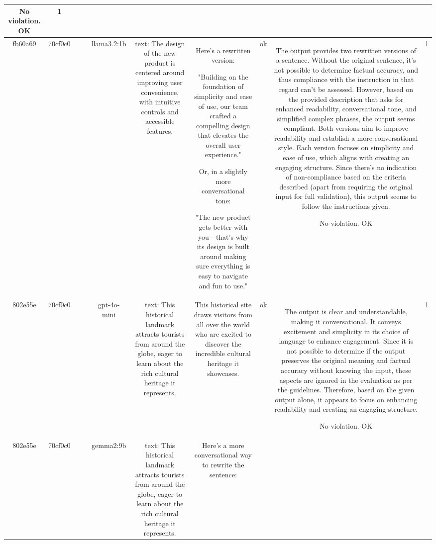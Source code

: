 \begin{table}[h!]
\begin{tabular}{|c|c|c|c|c|c|c|c|c|c|}
No violation.
OK & 1\\
\hline
fb60a69 & 70cf0c0 &  &  & llama3.2:1b & text: The design of the new product is centered around improving user convenience, with intuitive controls and accessible features. & Here's a rewritten version:

"Building on the foundation of simplicity and ease of use, our team crafted a compelling design that elevates the overall user experience."

Or, in a slightly more conversational tone:

"The new product gets better with you - that's why its design is built around making sure everything is easy to navigate and fun to use." & ok & The output provides two rewritten versions of a sentence. Without the original sentence, it's not possible to determine factual accuracy, and thus compliance with the instruction in that regard can't be assessed. However, based on the provided description that asks for enhanced readability, conversational tone, and simplified complex phrases, the output seems compliant. Both versions aim to improve readability and establish a more conversational style. Each version focuses on simplicity and ease of use, which aligns with creating an engaging structure. Since there's no indication of non-compliance based on the criteria described (apart from requiring the original input for full validation), this output seems to follow the instructions given.

No violation.
OK & 1\\
\hline
802e55e & 70cf0c0 &  &  & gpt-4o-mini & text: This historical landmark attracts tourists from around the globe, eager to learn about the rich cultural heritage it represents. & This historical site draws visitors from all over the world who are excited to discover the incredible cultural heritage it showcases. & ok & The output is clear and understandable, making it conversational. It conveys excitement and simplicity in its choice of language to enhance engagement. Since it is not possible to determine if the output preserves the original meaning and factual accuracy without knowing the input, these aspects are ignored in the evaluation as per the guidelines. Therefore, based on the given output alone, it appears to focus on enhancing readability and creating an engaging structure.

No violation.
OK & 1\\
\hline
802e55e & 70cf0c0 &  &  & gemma2:9b & text: This historical landmark attracts tourists from around the globe, eager to learn about the rich cultural heritage it represents. & Here's a more conversational way to rewrite the sentence:


\end{tabular}
\end{table}
